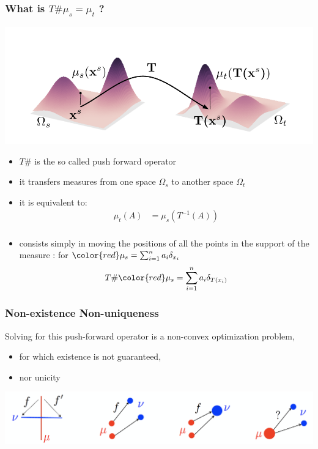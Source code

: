 \documentclass[french,9pt]{beamer}
\newcommand{\red}[1]{{\color{red} #1}}
\begin{document}
\begin{frame}
  \frametitle{What is $T\#\mu_s=\mu_t$ ?}
  \begin{center}
    \includegraphics[width=0.7\linewidth]{fig/T}
  \end{center}

\begin{itemize}
\item $T\#$ is the so called push forward operator
\item it transfers measures from one space $\Omega_s$ to another space $\Omega_t$
\item it is equivalent to:
\begin{align*}
\mu_t(A) & =  \mu_s(T^{-1}(A))\\
\end{align*}
\item consists simply in moving the positions of all the points in the support of the measure :
for $\red{\mu_{s}}=\sum_{i=1}^{n} a_{i} \delta_{x_{i}}$  $$T \#\red{\mu_{s}}=\sum_{i=1}^{n} a_{i} \delta_{T(x_{i})}$$
\end{itemize}
\end{frame}


\begin{frame}
  \frametitle{Non-existence Non-uniqueness}
  
Solving for this push-forward operator is a non-convex optimization problem, 
\begin{itemize}
\item for which existence is not guaranteed,
\item nor unicity
\end{itemize}

  \begin{center}
      \includegraphics[width=0.9\linewidth]{fig/exist}
  \end{center}
\end{frame}
\end{document}
